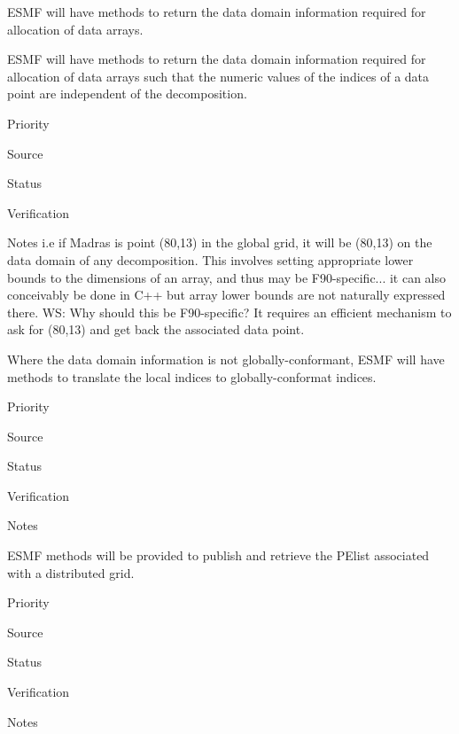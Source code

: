 
ESMF will have methods to return the data domain information required
for allocation of data arrays.


ESMF will have methods to return the data domain information required
for allocation of data arrays such that the numeric values of the
indices of a data point are independent of the decomposition.

\begin{reqlist}
\item[Priority]
\item[Source]
\item[Status]
\item[Verification]
\item[Notes] i.e if Madras is point (80,13) in the global grid, it
  will be (80,13) on the data domain of any decomposition. This
  involves setting appropriate lower bounds to the dimensions of an
  array, and thus may be F90-specific... it can also conceivably be
  done in C++ but array lower bounds are not naturally expressed
  there.  WS: Why should this be F90-specific?  
  It requires an efficient mechanism to ask for (80,13) and get 
  back the associated data point.
\end{reqlist}


Where the data domain information is not globally-conformant, 
ESMF will have methods to translate the local indices to
globally-conformat indices.

\begin{reqlist}
\item[Priority]
\item[Source]
\item[Status]
\item[Verification]
\item[Notes]
\end{reqlist}



ESMF methods will be provided to publish and retrieve the PElist
associated with a distributed grid.

\begin{reqlist}
\item[Priority]
\item[Source]
\item[Status]
\item[Verification]
\item[Notes]
\end{reqlist}

